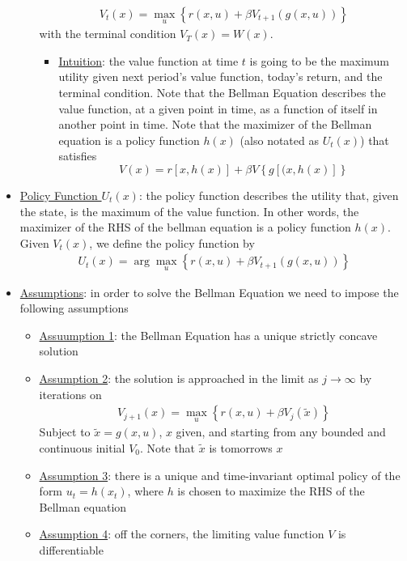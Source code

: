 \documentclass{article}
\begin{document}
\begin{itemize}
\begin{itemize}
\begin{gather*}
            V_{t}(x) = \max_{u} \left\{ r(x,u) + \beta V_{t+1} (g(x, u)) \right\}
        \end{gather*}
        with the terminal condition $V_{T}(x) = W(x)$.
         \begin{itemize}
            \item  \underline{Intuition}: the value function at time $t$ is going to be the maximum utility given next period's value function, today's return, and the terminal condition. Note that the Bellman Equation describes the value function, at a given point in time, as a function of itself in another point in time. Note that the maximizer of the Bellman equation is a policy function $h(x)$ (also notated as $U_{t}(x)$) that satisfies $$V(x) = r[x, h(x)] + \beta V \left\{g[(x, h(x)] \right\}$$
         \end{itemize}
    \end{itemize}
    \item  \underline{Policy Function $U_{t}(x)$}: the policy function describes the utility that, given the state, is the maximum of the value function. In other words, the maximizer of the RHS of the bellman equation is a policy function $h(x)$. Given $V_{t}(x)$, we define the policy function by
    \begin{gather*}
        U_{t}(x) = \arg \max_{u} \left\{ r(x,u) + \beta V_{t+1} (g(x, u)) \right\}
    \end{gather*}
    \item \underline{Assumptions}: in order to solve the Bellman Equation we need to impose the following assumptions
    \begin{itemize}
        \item  \underline{Assuumption 1}: the Bellman Equation has a unique strictly concave solution
        \item  \underline{Assumption 2}: the solution is approached in the limit as $j \rightarrow \infty$ by iterations on
        \begin{gather*}
            V_{j+1}(x) = \max_{u} \left\{r(x,u) + \beta V_{j}(\widetilde{x}) \right\}
        \end{gather*}
        Subject to $\widetilde{x} = g(x,u)$, $x$ given, and starting from any bounded and continuous initial $V_{0}$. Note that $\widetilde{x}$ is tomorrows $x$
        \item  \underline{Assumption 3}: there is a unique and time-invariant optimal policy of the form $u_{t} = h(x_{t})$, where $h$ is chosen to maximize the RHS of the Bellman equation
        \item  \underline{Assumption 4}: off the corners, the limiting value function $V$ is differentiable

\end{itemize}
\end{itemize}
\end{document}
